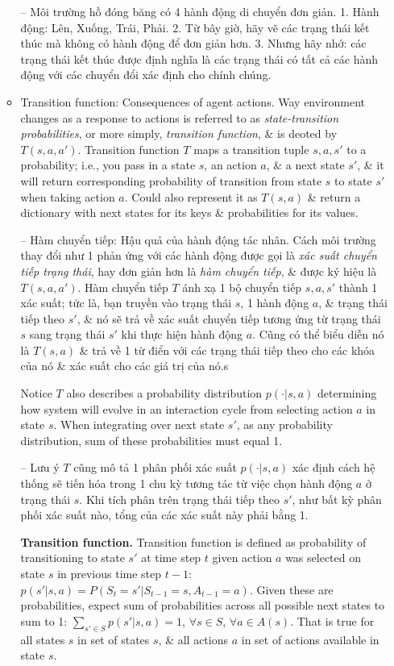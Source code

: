 \documentclass{article}
\begin{document}
\begin{itemize}
\begin{itemize}
        -- {\sf Môi trường hồ đóng băng có 4 hành động di chuyển đơn giản.} 1. Hành động: Lên, Xuống, Trái, Phải. 2. Từ bây giờ, hãy vẽ các trạng thái kết thúc mà không có hành động để đơn giản hơn. 3. Nhưng hãy nhớ: các trạng thái kết thúc được định nghĩa là các trạng thái có tất cả các hành động với các chuyển đổi xác định cho chính chúng.
        \item {\sf Transition function: Consequences of agent actions.} Way environment changes as a response to actions is referred to as {\it state-transition probabilities}, or more simply, {\it transition function}, \& is deoted by $T(s,a,a')$. Transition function $T$ maps a transition tuple $s,a,s'$ to a probability; i.e., you pass in a state $s$, an action $a$, \& a next state $s'$, \& it will return corresponding probability of transition from state $s$ to state $s'$ when taking action $a$. Could also represent it as $T(s,a)$ \& return a dictionary with next states for its keys \& probabilities for its values.

        -- {\sf Hàm chuyển tiếp: Hậu quả của hành động tác nhân.} Cách môi trường thay đổi như 1 phản ứng với các hành động được gọi là {\it xác suất chuyển tiếp trạng thái}, hay đơn giản hơn là {\it hàm chuyển tiếp}, \& được ký hiệu là $T(s,a,a')$. Hàm chuyển tiếp $T$ ánh xạ 1 bộ chuyển tiếp $s,a,s'$ thành 1 xác suất; tức là, bạn truyền vào trạng thái $s$, 1 hành động $a$, \& trạng thái tiếp theo $s'$, \& nó sẽ trả về xác suất chuyển tiếp tương ứng từ trạng thái $s$ sang trạng thái $s'$ khi thực hiện hành động $a$. Cũng có thể biểu diễn nó là $T(s,a)$ \& trả về 1 từ điển với các trạng thái tiếp theo cho các khóa của nó \& xác suất cho các giá trị của nó.s

        Notice $T$ also describes a probability distribution $p(\cdot|s,a)$ determining how system will evolve in an interaction cycle from selecting action $a$ in state $s$. When integrating over next state $s'$, as any probability distribution, sum of these probabilities must equal 1.

        -- Lưu ý $T$ cũng mô tả 1 phân phối xác suất $p(\cdot|s,a)$ xác định cách hệ thống sẽ tiến hóa trong 1 chu kỳ tương tác từ việc chọn hành động $a$ ở trạng thái $s$. Khi tích phân trên trạng thái tiếp theo $s'$, như bất kỳ phân phối xác suất nào, tổng của các xác suất này phải bằng 1.

        {\bf Transition function.} Transition function is defined as probability of transitioning to state $s'$ at time step $t$ given action $a$ was selected on state $s$ in previous time step $t - 1$: $p(s'|s,a) = P(S_t = s'|S_{t-1} = s,A_{t-1} = a)$. Given these are probabilities, expect sum of probabilities across all possible next states to sum to 1: $\sum_{s'\in S} p(s'|s,a) = 1$, $\forall s\in S$, $\forall a\in A(s)$. That is true for all states $s$ in set of states $s$, \& all actions $a$ in set of actions available in state $s$.


\end{itemize}
\end{itemize}
\end{document}
